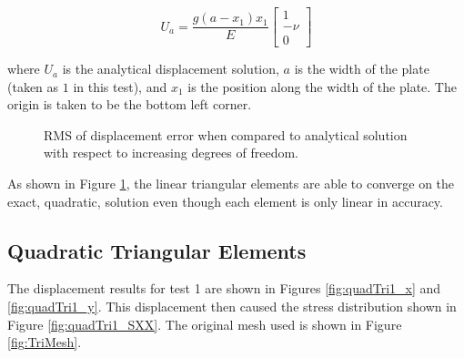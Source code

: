 \documentclass[a4paper, 12pt]{article}
\begin{document}
\begin{equation} \label{eq:AnaSol}
U_{a} = \frac{g(a-x_1)x_1}{E}
  \begin{bmatrix}
    1    \\
    -\nu \\
    0
  \end{bmatrix}
\end{equation}

\noindent
where $U_a$ is the analytical displacement solution, $a$ is the width
of the plate (taken as $1$ in this test), and $x_1$ is the position
along the width of the plate. The origin is taken to be the bottom
left corner.

\begin{figure}[H]
  \centering
{}
  \caption{RMS of displacement error when compared to analytical 
            solution with respect to increasing degrees of freedom.}
  \label{fig:triConv}
\end{figure}

As shown in Figure \ref{fig:triConv}, the linear triangular 
elements are able to converge on the exact, quadratic, solution
even though each element is only linear in accuracy.

\subsection{Quadratic Triangular Elements} \label{subsec:quadTris}
The displacement results for test 1 are shown in 
Figures \ref{fig:quadTri1_x} and \ref{fig:quadTri1_y}.
This displacement then caused the stress distribution 
shown in Figure \ref{fig:quadTri1_SXX}.
The original mesh used is shown in Figure \ref{fig:TriMesh}.
\end{document}
